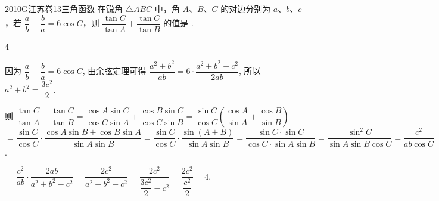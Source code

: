 
\begin{problem}{2010}{G}{江苏卷}{13}{三角函数}
在锐角 $ \triangle ABC $ 中，角 $ A $、$ B $、$ C $ 的对边分别为 $ a $、$ b $、$ c $，若 $ \dfrac{a}{b} + \dfrac{b}{a} = 6 \cos C $，则 $ \dfrac{\tan C}{\tan A} + \dfrac{\tan C}{\tan B} $ 的值是 \underline{\hspace{4em}}.
\end{problem}

\begin{answer}
$ 4 $
\end{answer}

\begin{solutions}
因为 $\dfrac{a}{b} + \dfrac{b}{a} = 6 \cos C $,  
由余弦定理可得 $ \dfrac{a^2 + b^2}{ab} = 6 \cdot \dfrac{a^2 + b^2 - c^2}{2ab} $,  
所以 $ a^2 + b^2 = \dfrac{3c^2}{2} $.  

则 $ \dfrac{\tan C}{\tan A} + \dfrac{\tan C}{\tan B} = \dfrac{\cos A \sin C}{\cos C \sin A} + \dfrac{\cos B \sin C}{\cos C \sin B} = \dfrac{\sin C}{\cos C} \left( \dfrac{\cos A}{\sin A} + \dfrac{\cos B}{\sin B} \right) $  
$ = \dfrac{\sin C}{\cos C} \cdot \dfrac{\cos A \sin B + \cos B \sin A}{\sin A \sin B} = \dfrac{\sin C}{\cos C} \cdot \dfrac{\sin (A + B)}{\sin A \sin B} = \dfrac{\sin C \cdot \sin C}{\cos C \cdot \sin A \sin B} = \dfrac{\sin^2 C}{\sin A \sin B \cos C} =\dfrac{c^2}{ab \cos C }$.  

$ =\dfrac{c^2}{ab} \cdot \dfrac{2ab}{a^2 + b^2 - c^2} = \dfrac{2c^2}{a^2 + b^2 - c^2} = \dfrac{2c^2}{\dfrac{3c^2}{2} - c^2} = \dfrac{2c^2}{\dfrac{c^2}{2}} = 4 $.
\end{solutions}
